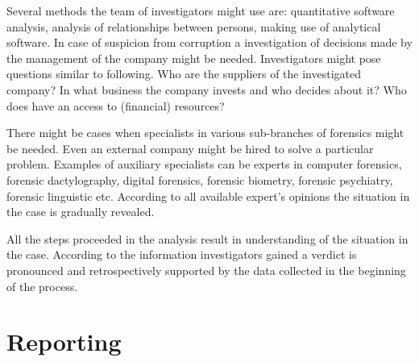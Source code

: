 Several methods the team of investigators might use are: quantitative software analysis, analysis of relationships between persons, making use of analytical software. In case of  suspicion from corruption a investigation of decisions made by the management of the company might be needed. Investigators might pose questions similar to following. Who are the suppliers of the investigated company? In what business the company invests and who decides about it? Who does have an access to (financial) resources?


There might be cases when specialists in various sub-branches of forensics might be needed. Even an external company might be hired to solve a particular problem. Examples of auxiliary specialists can be experts in computer forensics, forensic dactylography, digital forensics, forensic biometry, forensic psychiatry, forensic linguistic etc. According to all available expert's opinions the situation in the case is gradually revealed.

All the steps proceeded in the analysis result in understanding of the situation in the case. According to the information investigators gained a verdict is pronounced and retrospectively supported by the data collected in the beginning of the process. 

\section{Reporting}



